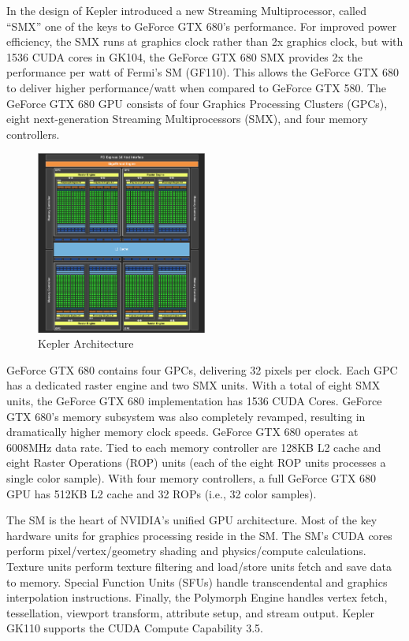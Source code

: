  In the design of Kepler introduced a new Streaming Multiprocessor, called “SMX” one of the keys to GeForce GTX 680’s performance. For improved power efficiency, the SMX runs at graphics clock rather than 2x graphics clock, but with 1536 CUDA cores in GK104, the GeForce GTX 680 SMX provides 2x the performance per watt of Fermi’s SM (GF110). This allows the GeForce GTX 680 to deliver higher performance/watt when compared to GeForce GTX 580. The GeForce GTX 680 GPU consists of four Graphics Processing Clusters (GPCs), eight next-generation Streaming Multiprocessors (SMX), and four memory controllers.
 
\begin{figure}[H]
   \centering
       \includegraphics[width=0.5\textwidth]{kepler}
   \caption{Kepler Architecture}
   \label{fig:kepler arch}
\end{figure}

GeForce GTX 680 contains four GPCs, delivering 32 pixels per clock. Each GPC has a dedicated raster engine and two SMX units. With a total of eight SMX units, the GeForce GTX 680 implementation has 1536 CUDA Cores.  GeForce GTX 680’s memory subsystem was also completely revamped, resulting in dramatically higher memory clock speeds. GeForce GTX 680 operates at 6008MHz data rate. Tied to each memory controller are 128KB L2 cache and eight Raster Operations (ROP) units (each of the eight ROP units processes a single color sample). With four memory controllers, a full GeForce GTX 680 GPU has 512KB L2 cache and 32 ROPs (i.e., 32 color samples).

The SM is the heart of NVIDIA’s unified GPU architecture. Most of the key hardware units for graphics processing reside in the SM. The SM’s CUDA cores perform pixel/vertex/geometry shading and physics/compute calculations. Texture units perform texture filtering and load/store units fetch and save data to memory. Special Function Units (SFUs) handle transcendental and graphics interpolation instructions. Finally, the Polymorph Engine handles vertex fetch, tessellation, viewport transform, attribute setup, and stream output. Kepler GK110 supports the CUDA Compute Capability 3.5.

